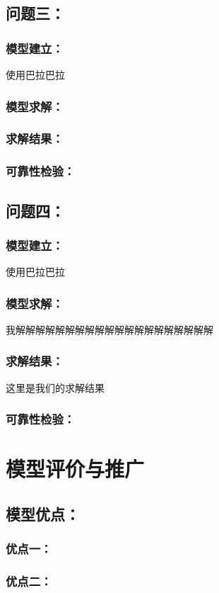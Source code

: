 \documentclass[zihao=-4,UTF8]{article}
\begin{document}
\subsection{问题三：}
\subsubsection{模型建立：}
使用巴拉巴拉
\subsubsection{模型求解：}
\subsubsection{求解结果：}
\subsubsection{可靠性检验：}

\subsection{问题四：}
\subsubsection{模型建立：}
使用巴拉巴拉
\subsubsection{模型求解：}
我解解解解解解解解解解解解解解解解解解解解
\subsubsection{求解结果：}
这里是我们的求解结果
\subsubsection{可靠性检验：}

\section{模型评价与推广}
\subsection{模型优点：}
\subsubsection{优点一：}
\subsubsection{优点二：}
\end{document}
